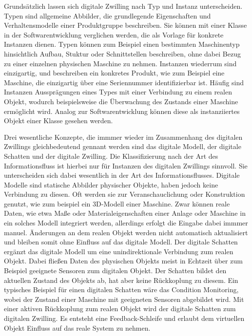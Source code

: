 Grundsätzlich lassen sich digitale Zwilling nach Typ und Instanz unterscheiden.
Typen sind allgemeine Abbilder, die grundlegende Eigenschaften und Verhaltensmodelle einer Produktgruppe beschreiben. 
Sie können mit einer Klasse in der Softwarentwicklung verglichen werden, die als Vorlage für konkrete Instanzen dienen.
Typen können zum Beispiel einen bestimmten Maschinentyp hinsichtlich Aufbau, Stuktur oder Schnittstellen beschreiben, ohne dabei Bezug zu einer einzelnen physischen Maschine zu nehmen.
Instanzen wiederrum sind einzigartig, und beschreiben ein konkretes Produkt, wie zum Beispiel eine Maschine, die einzigartig über eine Seriennummer identifizierbar ist.
Häufig sind Instanzen Aussprägungen eines Types mit einer Verbindung zu einem realen Objekt, wodurch beispielsweise die Überwachung des Zustands einer Maschine ermöglicht wird.
Analog zur Softwarentwicklung können diese als instanziiertes Objekt einer Klasse gesehen werden. \cite{ZEISS}

Drei wesentliche Konzepte, die immmer wieder im Zusammenhang des digitalen Zwillings gleichbedeutend gennant werden sind das digitale Modell, der digitale Schatten und der digitale Zwilling. \cite{ClassificationDT}
Die Klassifizierung nach der Art des Informationsfluss ist hierbei nur für Instanzen des digitalen Zwillings sinnvoll.
Sie unterscheiden sich dabei wesentlich in der Art des Informationsflusses.
Digitale Modelle sind statische Abbilder physischer Objekte, haben jedoch keine Verbindung zu diesen. 
Oft werden sie zur Veranschauclichung oder Konstruktion genutzt, wie zum beispiel ein 3D-Modell einer Maschine.
Zwar können reale Daten, wie etwa Maße oder Materialeigenschaften einer Anlage oder Maschine in ein solches Modell integriert werden, allerdings erfolgt die Eingabe dabei immmer manuel.
Änderungen an dem realen Objekt werden nicht automatisch aktualisiert und bleiben somit ohne Einfluss auf das digitale Modell.
Der digitale Schatten ergänzt das digitale Modell um eine unindirektionale Verbindung zum realen Objekt.
Dabei fließen Daten des physischen Objekts meist in Echtzeit über zum Beispiel geeignete Sensoren zum digitalen Objekt.
Der Schatten bildet den aktuellen Zustand des Objekts ab, hat aber keine Rückkoplung zu diesem.
Ein typisches Beispiel für einen digitalen Schatten wäre das Condition Monitoring, wobei der Zustand einer Maschine mit geeigneten Sensoren abgebildet wird.
Mit einer aktiven Rückkoplung zum realen Objekt wird der digitale Schatten zum digitalen Zwilling.
Es entsteht eine Feedback-Schleife und erlaubt dem virtuellen Objekt Einfluss auf das reale System zu nehmen.

